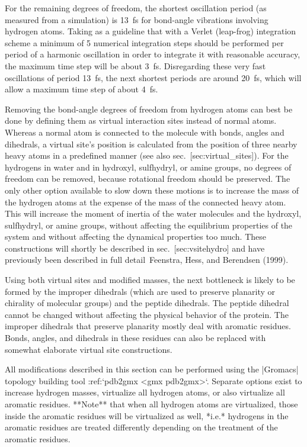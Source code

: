 For the remaining degrees of freedom, the shortest oscillation period
(as measured from a simulation) is 13 fs for bond-angle vibrations
involving hydrogen atoms. Taking as a guideline that with a Verlet
(leap-frog) integration scheme a minimum of 5 numerical integration
steps should be performed per period of a harmonic oscillation in order
to integrate it with reasonable accuracy, the maximum time step will be
about 3 fs. Disregarding these very fast oscillations of period 13 fs,
the next shortest periods are around 20 fs, which will allow a maximum
time step of about 4 fs.

Removing the bond-angle degrees of freedom from hydrogen atoms can best
be done by defining them as virtual interaction sites instead of normal
atoms. Whereas a normal atom is connected to the molecule with bonds,
angles and dihedrals, a virtual site’s position is calculated from the
position of three nearby heavy atoms in a predefined manner (see also
sec. [sec:virtual\_sites]). For the hydrogens in water and in hydroxyl,
sulfhydryl, or amine groups, no degrees of freedom can be removed,
because rotational freedom should be preserved. The only other option
available to slow down these motions is to increase the mass of the
hydrogen atoms at the expense of the mass of the connected heavy atom.
This will increase the moment of inertia of the water molecules and the
hydroxyl, sulfhydryl, or amine groups, without affecting the equilibrium
properties of the system and without affecting the dynamical properties
too much. These constructions will shortly be described in
sec. [sec:vsitehydro] and have previously been described in full
detail Feenstra, Hess, and Berendsen (1999).

Using both virtual sites and modified masses, the next bottleneck is
likely to be formed by the improper dihedrals (which are used to
preserve planarity or chirality of molecular groups) and the peptide
dihedrals. The peptide dihedral cannot be changed without affecting the
physical behavior of the protein. The improper dihedrals that preserve
planarity mostly deal with aromatic residues. Bonds, angles, and
dihedrals in these residues can also be replaced with somewhat elaborate
virtual site constructions.

All modifications described in this section can be performed using the
|Gromacs| topology building tool :ref:`pdb2gmx <gmx pdb2gmx>`. Separate options exist to
increase hydrogen masses, virtualize all hydrogen atoms, or also
virtualize all aromatic residues. **Note** that when all hydrogen atoms
are virtualized, those inside the aromatic residues will be virtualized
as well, *i.e.* hydrogens in the aromatic residues are treated
differently depending on the treatment of the aromatic residues.

